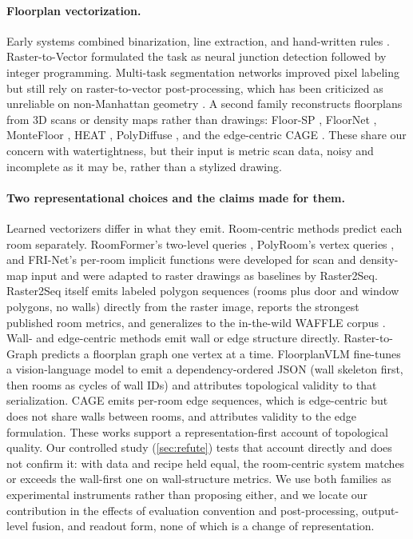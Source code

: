 \documentclass{article}
\begin{document}
\paragraph{Floorplan vectorization.}
Early systems combined binarization, line extraction, and hand-written rules
\citep{mace2010rooms,ahmed2011improved,delasheras2014statistical}.
Raster-to-Vector \citep{liu2017raster} formulated the task as neural junction
detection followed by integer programming. Multi-task segmentation networks
\citep{kalervo2019cubicasa,zeng2019deepfloorplan} improved pixel labeling but
still rely on raster-to-vector post-processing, which has been criticized as
unreliable on non-Manhattan geometry \citep{floorplanvlm2026}. A second family
reconstructs floorplans from 3D scans or density maps rather than drawings:
Floor-SP \citep{chen2019floorsp}, FloorNet \citep{liu2018floornet}, MonteFloor
\citep{stekovic2021montefloor}, HEAT \citep{chen2022heat}, PolyDiffuse
\citep{chen2023polydiffuse}, and the edge-centric CAGE \citep{cage2025}. These
share our concern with watertightness, but their input is metric scan data,
noisy and incomplete as it may be, rather than a stylized drawing.

\paragraph{Two representational choices and the claims made for them.}
Learned vectorizers differ in what they emit. Room-centric methods predict each
room separately. RoomFormer's two-level queries \citep{yue2023roomformer},
PolyRoom's vertex queries \citep{liu2024polyroom}, and FRI-Net's per-room
implicit functions \citep{xu2024frinet} were developed for scan and density-map
input and were adapted to raster drawings as baselines by Raster2Seq.
Raster2Seq itself \citep{phung2026raster2seq} emits labeled polygon sequences
(rooms plus door and window polygons, no walls) directly from the raster image,
reports the strongest published room metrics, and generalizes to the in-the-wild WAFFLE
corpus \citep{ganon2025waffle}. Wall- and edge-centric methods emit wall or edge
structure directly. Raster-to-Graph \citep{hu2024rastertograph} predicts a
floorplan graph one vertex at a time. FloorplanVLM \citep{floorplanvlm2026}
fine-tunes a vision-language model to emit a dependency-ordered JSON (wall
skeleton first, then rooms as cycles of wall IDs) and attributes topological
validity to that serialization. CAGE \citep{cage2025} emits per-room edge
sequences, which is edge-centric but does not share walls between rooms, and
attributes validity to the edge formulation. These works support a
representation-first account of topological quality. Our controlled study
(\cref{sec:refute}) tests that account directly and does not confirm it: with
data and recipe held equal, the room-centric system matches or exceeds the
wall-first one on wall-structure metrics. We use both families as
experimental instruments rather than proposing either, and we locate our
contribution in the effects of evaluation convention and post-processing,
output-level fusion, and readout form, none of which is a change of
representation.
\end{document}
